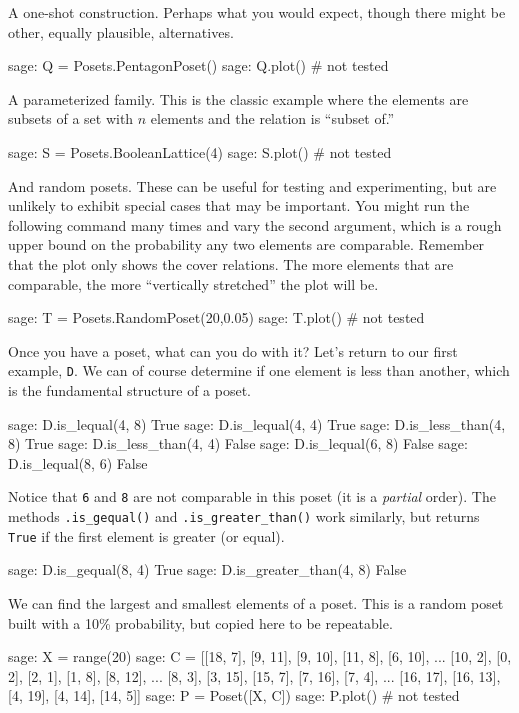 A one-shot construction.  Perhaps what you would expect, though there might be other, equally plausible, alternatives.
%
\begin{sageexample}
sage: Q = Posets.PentagonPoset()
sage: Q.plot()    # not tested
\end{sageexample}
%
A parameterized family.  This is the classic example where the elements are subsets of a set with $n$ elements and the relation is ``subset of.''
%
\begin{sageexample}
sage: S = Posets.BooleanLattice(4)
sage: S.plot()    # not tested
\end{sageexample}
%
And random posets.  These can be useful for testing and experimenting, but are unlikely to exhibit special cases that may be important.  You might run the following command many times and vary the second argument, which is a rough upper bound on the probability any two elements are comparable. Remember that the plot only shows the cover relations.  The more elements that are comparable, the more ``vertically stretched'' the plot will be.
%
\begin{sageexample}
sage: T = Posets.RandomPoset(20,0.05)
sage: T.plot()    # not tested
\end{sageexample}
%
%
Once you have a poset, what can you do with it?  Let's return to our first example, \verb?D?.  We can of course determine if one element is less than another, which is the fundamental structure of a poset.
%
\begin{sageexample}
sage: D.is_lequal(4, 8)
True
sage: D.is_lequal(4, 4)
True
sage: D.is_less_than(4, 8)
True
sage: D.is_less_than(4, 4)
False
sage: D.is_lequal(6, 8)
False
sage: D.is_lequal(8, 6)
False
\end{sageexample}
%
Notice that \verb?6? and \verb?8? are not comparable in this poset  (it is a \emph{partial} order).  The methods \verb?.is_gequal()?  and \verb?.is_greater_than()? work similarly, but returns \verb?True?  if the first element is greater (or equal).
%
\begin{sageexample}
sage: D.is_gequal(8, 4)
True
sage: D.is_greater_than(4, 8)
False
\end{sageexample}
%
We can find the largest and smallest elements of a poset.  This is a random poset built with a 10\% probability, but copied here to be repeatable.
%
\begin{sageexample}
sage: X = range(20)
sage: C = [[18, 7],  [9, 11], [9, 10], [11, 8], [6, 10],
...        [10, 2],   [0, 2],  [2, 1],  [1, 8], [8, 12],
...         [8, 3],  [3, 15], [15, 7], [7, 16],  [7, 4],
...       [16, 17], [16, 13], [4, 19], [4, 14], [14, 5]]
sage: P = Poset([X, C])
sage: P.plot()    # not tested
\end{sageexample}
